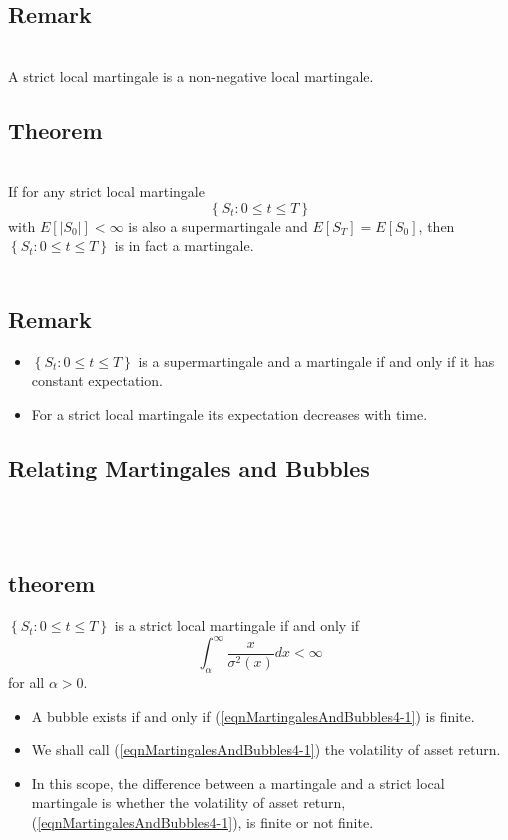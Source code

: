 \subsection{Remark}\\
 A strict local martingale is a non-negative local martingale.

\subsection{Theorem}\\
 If for any strict local martingale $$\left\lbrace S_t : 0 \leq t \leq T\right\rbrace $$ with $E \left[ \left\vert S_0
\right\vert \right] < \infty$ is also a supermartingale and $E \left[ S_T \right] = E \left[ S_0 \right] $, then
$\left\lbrace S_t : 0 \leq t \leq T\right\rbrace $ is in fact a martingale. \\\\
\subsection{Remark}
\begin{itemize}
\item $\left\lbrace S_t : 0 \leq t \leq T\right\rbrace $ is a supermartingale and a martingale if and only if it
has constant expectation.\item For a strict local martingale its expectation decreases with time.
\end{itemize} 

\subsection{Relating Martingales and Bubbles}\\\\
\subsection{theorem}
 $\left\lbrace S_t : 0 \leq t \leq T\right\rbrace $ is a strict local martingale if and only if
\begin{equation}\label{eqnMartingalesAndBubbles4-1}
\int_\alpha^\infty \frac{x}{\sigma^2(x)}dx < \infty
\end{equation} 
for all $\alpha > 0$.

\begin{itemize}
\item A bubble exists if and only if (\ref{eqnMartingalesAndBubbles4-1}) is finite.
\item We shall call (\ref{eqnMartingalesAndBubbles4-1}) the volatility of asset return.
\end{itemize} 
\begin{itemize}
\item In this scope, the difference between a martingale and a strict local martingale is whether the volatility of
asset return, (\ref{eqnMartingalesAndBubbles4-1}), is finite or not finite.
\end{itemize}


